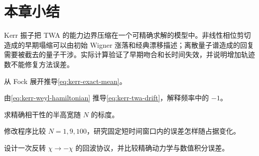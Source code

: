 \section*{本章小结}

Kerr 振子把 TWA 的能力边界压缩在一个可精确求解的模型中。非线性相位剪切造成的早期塌缩可以由初始 Wigner 涨落和经典漂移描述；离散量子谱造成的回复需要被截去的量子干涉。实际计算验证了早期吻合和长时间失效，并说明增加轨迹数不能修复方法误差。

\begin{exercises}
  \item 从 Fock 展开推导\cref{eq:kerr-exact-mean}。
  \item 由\cref{eq:kerr-weyl-hamiltonian} 推导\cref{eq:kerr-twa-drift}，解释频率中的 $-1$。
  \item 求精确相干性的半高宽随 $N$ 的标度。
  \item 修改程序比较 $N=1,9,100$，研究固定短时间窗口内的误差怎样随占据变化。
  \item 设计一次反转 $\chi\to-\chi$ 的回波协议，并比较精确动力学与数值积分误差。
\end{exercises}
